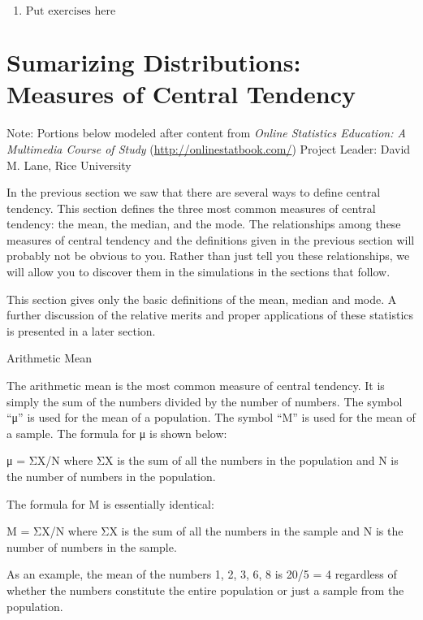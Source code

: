 \documentclass[
]{book}
\providecommand{\tightlist}{%
  \setlength{\itemsep}{0pt}\setlength{\parskip}{0pt}}
\begin{document}
\begin{enumerate}
\def\labelenumi{\arabic{enumi}.}
\tightlist
\item
  \(\text{Put exercises here}\)
\end{enumerate}

\hypertarget{sumarizing-distributions-measures-of-central-tendency}{%
\chapter{Sumarizing Distributions: Measures of Central Tendency}\label{sumarizing-distributions-measures-of-central-tendency}}

Note: Portions below modeled after content from
\emph{Online Statistics Education: A Multimedia Course of Study}
(\url{http://onlinestatbook.com/}) Project Leader: David M. Lane, Rice University

In the previous section we saw that there are several ways to define central tendency. This section defines the three most common measures of central tendency: the mean, the median, and the mode. The relationships among these measures of central tendency and the definitions given in the previous section will probably not be obvious to you. Rather than just tell you these relationships, we will allow you to discover them in the simulations in the sections that follow.

This section gives only the basic definitions of the mean, median and mode. A further discussion of the relative merits and proper applications of these statistics is presented in a later section.

Arithmetic Mean

The arithmetic mean is the most common measure of central tendency. It is simply the sum of the numbers divided by the number of numbers. The symbol ``μ'' is used for the mean of a population. The symbol ``M'' is used for the mean of a sample. The formula for μ is shown below:

μ = ΣX/N
where ΣX is the sum of all the numbers in the population and
N is the number of numbers in the population.

The formula for M is essentially identical:

M = ΣX/N
where ΣX is the sum of all the numbers in the sample and
N is the number of numbers in the sample.

As an example, the mean of the numbers 1, 2, 3, 6, 8 is 20/5 = 4 regardless of whether the numbers constitute the entire population or just a sample from the population.
\end{document}
